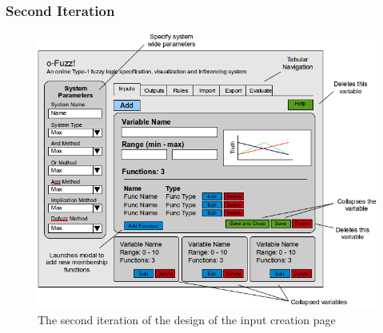 \subsubsection{Second Iteration}

\begin{figure}[ht!]
\begin{center}
\includegraphics[width=1.1\textwidth]{images/secondItInputs}
\end{center}
\vspace{-6mm}
\caption{The second iteration of the design of the input creation page}
\label{fig:design-secondIterationInputs}

\end{figure}
\noindent

